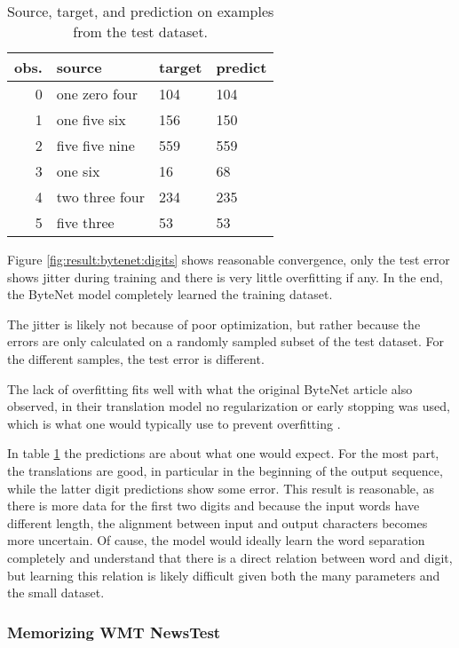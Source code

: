 \begin{table}[h]
\centering
\begin{tabular}{r|p{3.3cm} p{3.3cm} p{3.3cm}}
	obs. & source & target & predict\\ \hline
  0 & one zero four & 104 & 104 \\
  1 & one five six & 156 & 150 \\
  2 & five five nine & 559 & 559 \\
  3 & one six & 16 & 68 \\
  4 & two three four & 234 & 235 \\
  5 & five three & 53 & 53
\end{tabular}
\caption{Source, target, and prediction on examples from the test dataset.}
\label{table:result:bytenet:digits}
\end{table}

Figure \ref{fig:result:bytenet:digits} shows reasonable convergence, only the test error shows jitter during training and there is very little overfitting if any. In the end, the ByteNet model completely learned the training dataset.

The jitter is likely not because of poor optimization, but rather because the errors are only calculated on a randomly sampled subset of the test dataset. For the different samples, the test error is different.

The lack of overfitting fits well with what the original ByteNet article also observed, in their translation model no regularization or early stopping was used, which is what one would typically use to prevent overfitting \cite{bytenet}.

In table \ref{table:result:bytenet:digits} the predictions are about what one would expect. For the most part, the translations are good, in particular in the beginning of the output sequence, while the latter digit predictions show some error. This result is reasonable, as there is more data for the first two digits and because the input words have different length, the alignment between input and output characters becomes more uncertain. Of cause, the model would ideally learn the word separation completely and understand that there is a direct relation between word and digit, but learning this relation is likely difficult given both the many parameters and the small dataset.

\clearpage
\subsubsection{Memorizing WMT NewsTest}

